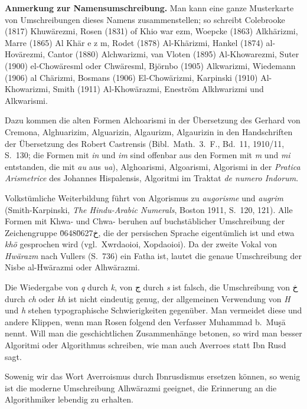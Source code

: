 \documentclass[11pt,a4paper]{article}
\newcommand{\greekname}[1]{{\greekfont #1}}
\newcommand{\RL}[1]{\beginR#1\endR}
\newcommand{\ar}[1]{{\arabicfont\RL{#1}}}
\begin{document}
\textbf{Anmerkung zur Namensumschreibung.} Man kann eine ganze Musterkarte von Umschreibungen dieses Namens zusammenstellen; so schreibt Colebrooke (1817) Khuw\"arezmi, Rosen (1831) of Khio war ezm, Woepcke (1863) Alkh\"arizmi, Marre (1865) Al Kh\"ar e z m, Rodet (1878) Al-Kh\"arizmi, Hankel (1874) al-Hov\"arezmi, Cantor (1880) Alchwarizmi, van Vloten (1895) Al-Khowarezmi, Suter (1900) el-Chow\"aresml oder Chw\"aresml, Bj\"ornbo (1905) Alkwarizmi, Wiedemann (1906) al Ch\"arizmi, Bosmans (1906) El-Chow\"arizmi, Karpinski (1910) Al-Khowarizmi, Smith (1911) Al-Khow\"arazmi, Enestr\"om Alkhwarizmi und Alkwarismi.

Dazu kommen die alten Formen Alchoarismi in der \"Ubersetzung des Gerhard von Cremona, Alghuarizim, Alguarizin, Algaurizm, Algaurizin in den Handschriften der \"Ubersetzung des Robert Castrensis (Bibl.\ Math.\ 3.\ F., Bd.\ 11, 1910/11, S.\ 130; die Formen mit \textit{in} und \textit{im} sind offenbar aus den Formen mit \textit{m} und \textit{mi} entstanden, die mit \textit{au} aus \textit{ua}), Alghoarismi, Algoarismi, Algorismi in der \textit{Pratica Arismetrice} des Johannes Hispalensis, Algoritmi im Traktat \textit{de numero Indorum}.

Volkst\"umliche Weiterbildung f\"uhrt von Algorismus zu \textit{augorisme} und \textit{augrim} (Smith-Karpinski, \textit{The Hindu-Arabic Numerals}, Boston 1911, S.\ 120, 121). Alle Formen mit Khwa- und Chwa- beruhen auf buchst\"ablicher Umschreibung der Zeichengruppe \ar{خ\u0648\u0627}, die der persischen Sprache eigent\"umlich ist und etwa \textit{kh\"o} gesprochen wird (vgl.\ \greekname Xwrdaoioi, Xopdaoioi). Da der zweite Vokal von \textit{Hw\"arazm} nach Vullers (S.\ 736) ein Fatha ist, lautet die genaue Umschreibung der Nisbe al-Hw\"arazmi oder Alhw\"arazmi.

Die Wiedergabe von \textit{q} durch \textit{k}, von \ar{ج} durch \textit{s} ist falsch, die Umschreibung von \ar{خ} durch \textit{ch} oder \textit{kh} ist nicht eindeutig genug, der allgemeinen Verwendung von \textit{H} und \textit{h} stehen typographische Schwierigkeiten gegen\"uber. Man vermeidet diese und andere Klippen, wenn man Rosen folgend den Verfasser Muhammad b.\ Mu\d{s}\d{}\=a nennt. Will man die geschichtlichen Zusammenh\"ange betonen, so wird man besser Algoritmi oder Algorithmus schreiben, wie man auch Averroes statt Ibn Rusd sagt.

Sowenig wir das Wort Averroismus durch Ibnrusdismus ersetzen k\"onnen, so wenig ist die moderne Umschreibung Alhw\"arazmi geeignet, die Erinnerung an die Algorithmiker lebendig zu erhalten.
\end{document}
